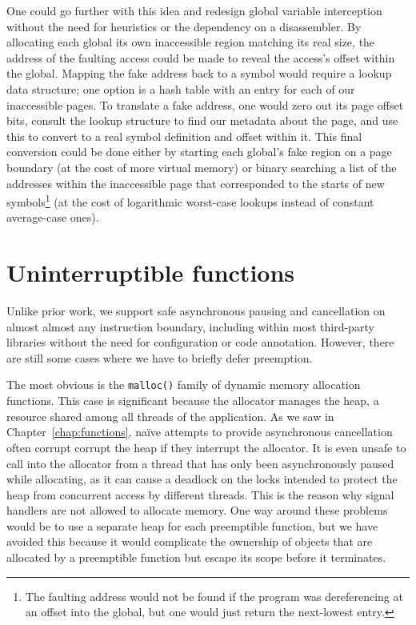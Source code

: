 One could go further with this idea and redesign global variable interception without
the need for heuristics or the dependency on a disassembler.  By allocating each
global its own inaccessible region matching its real size, the address of the
faulting access could be made to reveal the access's offset within the global.
Mapping the fake address back to a symbol would require a lookup data structure; one
option is a hash table with an entry for each of our inaccessible pages.  To
translate a fake address, one would zero out its page offset bits, consult the lookup
structure to find our metadata about the page, and use this to convert to a real
symbol definition and offset within it.  This final conversion could be done either
by starting each global's fake region on a page boundary (at the cost of more virtual
memory) or binary searching a list of the addresses within the inaccessible page that
corresponded to the starts of new symbols\footnote{The faulting address would not be
found if the program was dereferencing at an offset into the global, but one would
just return the next-lowest entry.} (at the cost of logarithmic worst-case lookups
instead of constant average-case ones).


\section{Uninterruptible functions}

Unlike prior work, we support safe asynchronous pausing and cancellation on almost
almost any instruction boundary, including within most third-party libraries without
the need for configuration or code annotation.  However, there are still some cases
where we have to briefly defer preemption.

The most obvious is the \texttt{malloc()} family of dynamic memory allocation
functions.  This case is significant because the allocator manages the heap, a
resource shared among all threads of the application.  As we saw in
Chapter~\ref{chap:functions}, na\"ive attempts to provide asynchronous cancellation
often corrupt corrupt the heap if they interrupt the allocator.  It is even unsafe to
call into the allocator from a thread that has only been asynchronously paused while
allocating, as it can cause a deadlock on the locks intended to protect the heap from
concurrent access by different threads.  This is the reason why signal handlers are
not allowed to allocate memory.  One way around these problems would be to use a
separate heap for each preemptible function, but we have avoided this because it
would complicate the ownership of objects that are allocated by a preemptible
function but escape its scope before it terminates.

